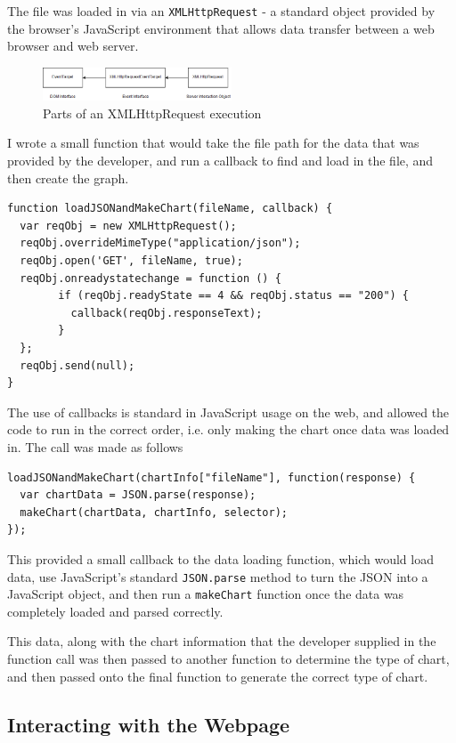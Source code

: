 \documentclass[ %
                    author={Aleena Baig},
                supervisor={Dr Simon Lock},
                    degree={BSc},
                     title={On Making Web Accessible Graphs},
                  subtitle={},
                      year={2019} ]{dissertation}
\begin{document}
The file was loaded in via an \texttt{XMLHttpRequest} - a standard object provided by the browser's JavaScript environment that allows data transfer between a web browser and web server.

\begin{figure}[h]
\caption{Parts of an XMLHttpRequest execution}
\centering
\includegraphics[width=0.5\textwidth]{images/XMLHttpRequest.png}
\end{figure}

I wrote a small function that would take the file path for the data that was provided by the developer, and run a callback to find and load in the file, and then create the graph.

\begin{lstlisting}
function loadJSONandMakeChart(fileName, callback) {
  var reqObj = new XMLHttpRequest();
  reqObj.overrideMimeType("application/json");
  reqObj.open('GET', fileName, true);
  reqObj.onreadystatechange = function () {
        if (reqObj.readyState == 4 && reqObj.status == "200") {
          callback(reqObj.responseText);
        }
  };
  reqObj.send(null);
}
\end{lstlisting}

The use of callbacks is standard in JavaScript usage on the web, and allowed the code to run in the correct order, i.e. only making the chart once data was loaded in. The call was made as follows

\begin{lstlisting}
loadJSONandMakeChart(chartInfo["fileName"], function(response) {
  var chartData = JSON.parse(response);
  makeChart(chartData, chartInfo, selector);
});
\end{lstlisting}

This provided a small callback to the data loading function, which would load data, use JavaScript's standard \texttt{JSON.parse} method to turn the JSON into a JavaScript object, and then run a \texttt{makeChart} function once the data was completely loaded and parsed correctly.

This data, along with the chart information that the developer supplied in the function call was then passed to another function to determine the type of chart, and then passed onto the final function to generate the correct type of chart.

\subsection{Interacting with the Webpage}
\end{document}

